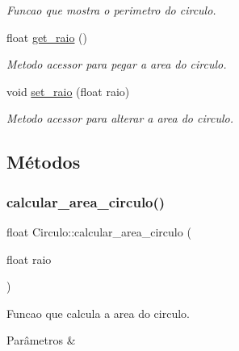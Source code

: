 \begin{DoxyCompactItemize}
\begin{DoxyCompactList}\small\item\em Funcao que mostra o perimetro do circulo. \end{DoxyCompactList}\item 
float \hyperlink{classCirculo_a3e15806c8d2eeba9363ebca894bf9b8c}{get\+\_\+raio} ()
\begin{DoxyCompactList}\small\item\em Metodo acessor para pegar a area do circulo. \end{DoxyCompactList}\item 
void \hyperlink{classCirculo_a8e3aaa58470094b99c94efcf8891f84a}{set\+\_\+raio} (float raio)
\begin{DoxyCompactList}\small\item\em Metodo acessor para alterar a area do circulo. \end{DoxyCompactList}\end{DoxyCompactItemize}


\subsection{Métodos}
\mbox{\label{classCirculo_a8b1dcd969c061e1ced2fc8a09995baf1}} 
\subsubsection{\texorpdfstring{calcular\+\_\+area\+\_\+circulo()}{calcular\_area\_circulo()}}
{\footnotesize\ttfamily float Circulo\+::calcular\+\_\+area\+\_\+circulo (\begin{DoxyParamCaption}\item[{float}]{raio }\end{DoxyParamCaption})}



Funcao que calcula a area do circulo. 


\begin{DoxyParams}{Parâmetros}
{\em } & \\
\hline
\end{DoxyParams}
\mbox{\label{classCirculo_a7a252b9ffe65913908a1da8720290239}} 
